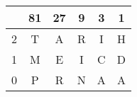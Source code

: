 \begin{center}
\begin{tabular}{c|ccccc}
& 81 & 27 & 9 & 3 & 1 \\\hline
2 & T & A & R & I & H \\
1 & M & E & I & C & D \\
0 & P & R & N & A & A
\end{tabular}
\end{center}
